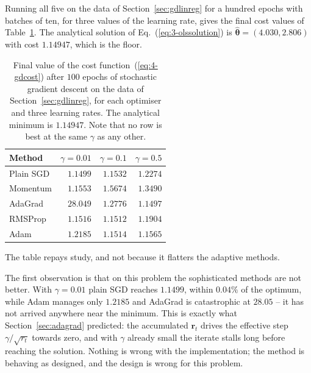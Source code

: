 Running all five on the data of Section~\ref{sec:gdlinreg} for a hundred
epochs with batches of ten, for three values of the learning rate, gives the
final cost values of Table~\ref{tab:optimcompare}.  The analytical solution of
Eq.~(\ref{eq:3-olssolution}) is $\hat{\bm{\theta}}=(4.030,2.806)$ with cost
$1.14947$, which is the floor.

\begin{table}[h]
\centering
\renewcommand{\arraystretch}{1.25}
\setlength{\tabcolsep}{12pt}
\begin{tabular}{lrrr}
\toprule
\textbf{Method} & $\gamma=0.01$ & $\gamma=0.1$ & $\gamma=0.5$\\
\midrule
Plain SGD          & $1.1499$  & $1.1532$ & $1.2274$\\
Momentum           & $1.1553$  & $1.5674$ & $1.3490$\\
AdaGrad            & $28.049$  & $1.2776$ & $\mathbf{1.1497}$\\
RMSProp            & $1.1516$  & $1.1512$ & $1.1904$\\
Adam               & $1.2185$  & $1.1514$ & $1.1565$\\
\bottomrule
\end{tabular}
\caption{Final value of the cost function~(\ref{eq:4-gdcost}) after $100$
epochs of stochastic gradient descent on the data of
Section~\ref{sec:gdlinreg}, for each optimiser and three learning rates.  The
analytical minimum is $1.14947$.  Note that no row is best at the same $\gamma$
as any other.}
\label{tab:optimcompare}
\end{table}

The table repays study, and not because it flatters the adaptive methods.

The first observation is that on this problem the sophisticated methods are
not better.  With $\gamma=0.01$ plain SGD reaches $1.1499$, within $0.04\%$ of
the optimum, while Adam manages only $1.2185$ and AdaGrad is catastrophic at
$28.05$ -- it has not arrived anywhere near the minimum.  This is exactly what
Section~\ref{sec:adagrad} predicted: the accumulated $\bm{r}_t$ drives the
effective step $\gamma/\sqrt{r_t}$ towards zero, and with $\gamma$ already small
the iterate stalls long before reaching the solution.  Nothing is wrong with
the implementation; the method is behaving as designed, and the design is
wrong for this problem.

